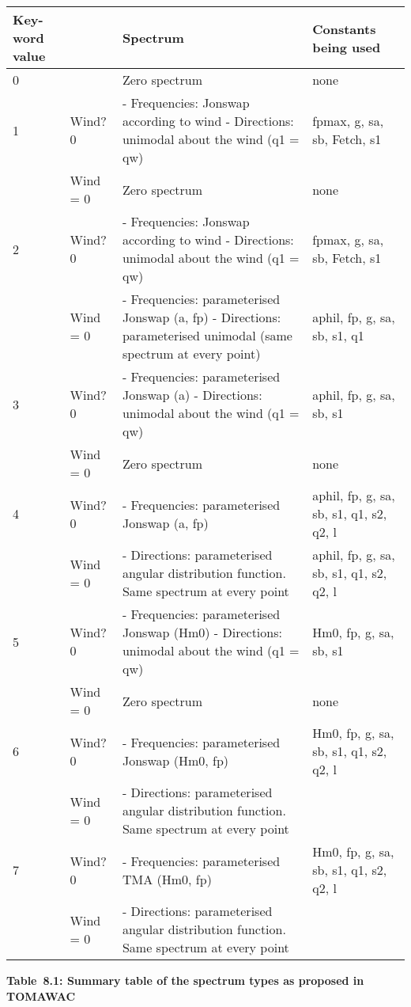 \begin{tabular}{|p{0.5in}|p{0.5in}|p{2.2in}|p{0.8in}|} \hline
Key-word value &  & Spectrum & Constants being used \\ \hline
0 &  & Zero spectrum & none \\ \hline
1 & Wind? 0 & - Frequencies: Jonswap according to wind  - Directions: unimodal about the wind (q1 = qw) & fpmax, g, sa, sb, Fetch, s1 \\ \hline
 & Wind = 0 & Zero spectrum & none \\ \hline
2 & Wind? 0 & - Frequencies: Jonswap according to wind - Directions: unimodal about the wind (q1 = qw) & fpmax, g, sa, sb, Fetch, s1 \\ \hline
 & Wind = 0 & - Frequencies: parameterised Jonswap (a, fp) - Directions: parameterised unimodal (same spectrum at every point) & aphil, fp, g, sa, sb, s1, q1 \\ \hline
3 & Wind? 0 & - Frequencies: parameterised Jonswap (a) - Directions: unimodal about the wind (q1 = qw) & aphil, fp, g, sa, sb, s1 \\ \hline
 & Wind = 0 & Zero spectrum & none \\ \hline
4 & Wind? 0 & - Frequencies: parameterised Jonswap (a, fp) & aphil, fp, g, sa, sb, s1, q1, s2, q2, l \\ \hline
 & Wind = 0 & - Directions: parameterised angular distribution function. Same spectrum at every point & aphil, fp, g, sa, sb, s1, q1, s2, q2, l \\ \hline
5 & Wind? 0 & - Frequencies: parameterised Jonswap (Hm0) - Directions: unimodal about the wind  (q1 = qw) & Hm0, fp, g, sa, sb, s1 \\ \hline
 & Wind = 0 & Zero spectrum & none \\ \hline
6 & Wind? 0 & - Frequencies: parameterised Jonswap  (Hm0, fp) & Hm0, fp, g, sa, sb, s1, q1, s2, q2, l \\ \hline
 & Wind = 0 & - Directions: parameterised angular distribution function. Same spectrum at every point &  \\ \hline
7 & Wind? 0 & - Frequencies: parameterised TMA (Hm0, fp) & Hm0, fp, g, sa, sb, s1, q1, s2, q2, l \\ \hline
 & Wind = 0 & - Directions: parameterised angular distribution function. Same spectrum at every point &  \\ \hline
\end{tabular}

\textbf{Table~8.1: Summary table of the spectrum types as proposed in TOMAWAC}


